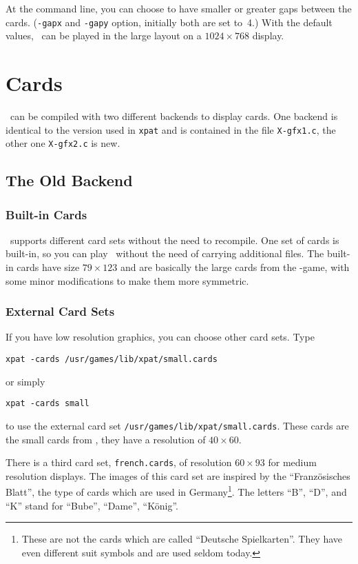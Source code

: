 At the command line, you can choose to have smaller or greater gaps between
the cards. ({\tt -gapx} and {\tt -gapy} option, initially both are set to~4.)
With the default values, \spider\ can be played in the large layout on a
$1024\times 768$ display.

\section{Cards}
\xpat\ can be compiled with two different backends to display cards.
One backend is identical to the version used in {\tt xpat} and is contained
in the file {\tt X-gfx1.c}, the other one {\tt X-gfx2.c} is new.


\subsection{The Old Backend}

\subsubsection*{Built-in Cards}
\xpat\ supports different card sets without the need to recompile.
One set of cards is built-in, so you can play \xpat\ without the need of
carrying additional files. 
The built-in cards have size $79\times 123$ and are basically the large
cards from the \spider-game, with some minor modifications to make them
more symmetric.

\subsubsection{External Card Sets}
If you have low resolution graphics, you can choose other card sets.
Type
\begin{center}
  {\tt xpat -cards /usr/games/lib/xpat/small.cards}
\end{center}
or simply
\begin{center}
  {\tt xpat -cards small}
\end{center}
to use the external card set {\tt /usr/games/lib/xpat/small.cards}.
These cards are the small cards from \spider, they have a resolution of
$40\times60$.

There is a third card set, {\tt french.cards}, of resolution $60\times93$
for medium resolution displays.
The images of this card set are inspired by the ``Franz\"osisches Blatt'',
the type of cards which are used in Germany\footnote{These are not
the cards which are called ``Deutsche Spielkarten''.
They have even different suit symbols and are used seldom today.}.
The letters ``B'', ``D'', and ``K'' stand for ``Bube'', ``Dame'', ``K\"onig''.

